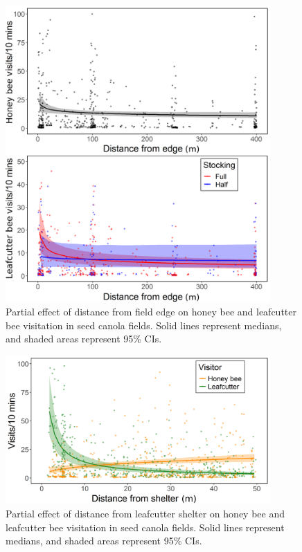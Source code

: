 \documentclass[12pt]{article} %
\begin{document}
\begin{figure}
    \centering
    \includegraphics[width=0.9\textwidth,keepaspectratio=true]{slopeHbeeDist_both.png}
    \caption[Partial effect of distance from field edge on bee visitation in seed canola fields]{Partial effect of distance from field edge on honey bee and leafcutter bee visitation in seed canola fields. Solid lines represent medians, and shaded areas represent 95\% CIs.}
    \label{fig:hbeeDist_both}
\end{figure}


\begin{figure}
    \centering
    \includegraphics[width=0.9\textwidth,keepaspectratio=true]{slopeLbeeDistBothBees.png}
    \caption[Partial effect of distance from leafcutter shelter on bee visitation in seed canola fields]{Partial effect of distance from leafcutter shelter on honey bee and leafcutter bee visitation in seed canola fields. Solid lines represent medians, and shaded areas represent 95\% CIs.}
    \label{fig:lbeeDist_both}
\end{figure} %
\end{document}

